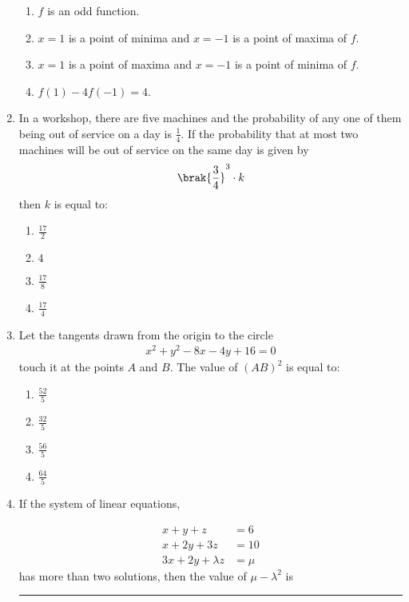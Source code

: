 \documentclass{article}
\begin{document}
\begin{enumerate}
\begin{enumerate}   
   \item $f$ is an odd function.
   \item $x = 1$ is a point of minima and $x = -1$ is a point of maxima of $f$.
   \item $x = 1$ is a point of maxima and $x = -1$ is a point of minima of $f$.
   \item $f(1) - 4f(-1) = 4$.
\end{enumerate}

\item In a workshop, there are five machines and the probability of any one of them being out of service on a day is $\frac{1}{4}$. If the probability that at most two machines will be out of service on the same day is given by \begin{align*}\brak {\frac{3}{4}} ^3 \cdot k \end{align*}then $k$ is equal to:

\begin{enumerate}    
   \item $\frac{17}{2}$
   \item $4$
   \item $\frac{17}{8}$
   \item $\frac{17}{4}$
\end{enumerate}

\item Let the tangents drawn from the origin to the circle \begin{align*}x^2 + y^2 - 8x - 4y + 16 = 0\end{align*}touch it at the points $A$ and $B$. The value of $(AB)^2$ is equal to:

\begin{enumerate}
   \item $\frac{52}{5}$
   \item $\frac{32}{5}$
   \item $\frac{56}{5}$
   \item $\frac{64}{5}$
\end{enumerate}

\item If the system of linear equations,

\begin{align*}
    x + y + z &= 6 \\
    x + 2y + 3z &= 10 \\
    3x + 2y + \lambda z &= \mu
\end{align*}has more than two solutions, then the value of $\mu -\lambda^2$ is \rule{1cm}{0.1pt}


\end{enumerate}
\end{document}
